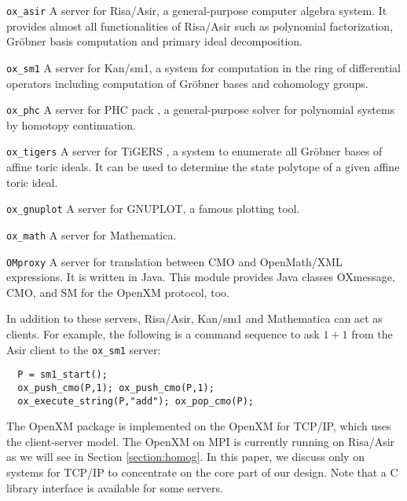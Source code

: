 \begin{description}
\item{\tt ox\_asir}
A server for Risa/Asir, a general-purpose computer algebra
system. It provides almost
all functionalities of Risa/Asir such as polynomial factorization,
Gr\"obner basis computation and primary ideal decomposition.
\item{\tt ox\_sm1}
A server for Kan/sm1, a system for computation in 
the ring of differential operators including computation of Gr\"obner bases
and cohomology groups.
\item {\tt ox\_phc}
A server for PHC pack \cite{phc}, a general-purpose solver for
polynomial systems by homotopy continuation. 
\item {\tt ox\_tigers}
A server for TiGERS \cite{tigers}, a system to enumerate
all Gr\"obner bases of affine toric ideals.
It can be used to determine the state polytope
of a given affine toric ideal.
\item {\tt ox\_gnuplot}
A server for GNUPLOT, a famous plotting tool.
\item {\tt ox\_math}
A server for Mathematica.
\item {\tt OMproxy}
A server for translation between CMO and OpenMath/XML expressions.
It is written in Java.
This module provides Java classes OXmessage, CMO, and SM
for the OpenXM protocol, too.
\end{description}
In addition to these servers, Risa/Asir, Kan/sm1 and Mathematica
can act as clients. 
For example, the following is a command sequence to ask $1+1$ from
the Asir client to the {\tt ox\_sm1} server:
\begin{verbatim}
  P = sm1_start();
  ox_push_cmo(P,1); ox_push_cmo(P,1);
  ox_execute_string(P,"add"); ox_pop_cmo(P);
\end{verbatim}
The OpenXM package is implemented on the  OpenXM for TCP/IP, 
which uses the client-server model.
The OpenXM on MPI \cite{MPI} is currently running on Risa/Asir
as we will see in Section \ref{section:homog}.
In this paper, we discuss only on systems for TCP/IP
to concentrate on the core part of our design.
Note that a C library interface is available for some servers.





